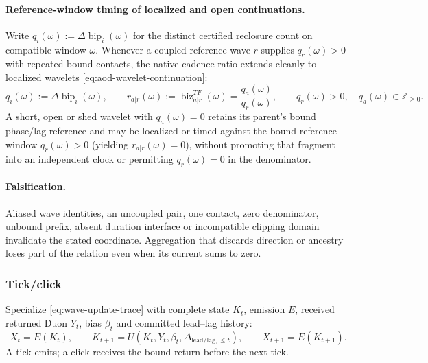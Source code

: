 \paragraph{Reference-window timing of localized and open continuations.}
Write \(q_i(\omega):=\Delta\operatorname{bip}_i(\omega)\) for the distinct
certified reclosure count on compatible window \(\omega\). Whenever a coupled
reference wave \(r\) supplies \(q_r(\omega)>0\) with repeated bound contacts,
the native cadence ratio extends cleanly to localized wavelets \eqref{eq:aod-wavelet-continuation}:
\begin{equation}
q_i(\omega):=\Delta\operatorname{bip}_i(\omega),
\qquad
r_{a|r}(\omega):=\operatorname{biz}^{TF}_{a|r}(\omega)=\frac{q_a(\omega)}{q_r(\omega)},
\qquad
q_r(\omega)>0,\quad q_a(\omega)\in\mathbb Z_{\ge 0}.
\label{eq:wavelet-reference-timing}
\end{equation}
A short, open or shed wavelet with \(q_a(\omega)=0\) retains its parent's bound
phase/lag reference and may be localized or timed against the bound reference
window \(q_r(\omega)>0\) (yielding \(r_{a|r}(\omega)=0\)), without promoting
that fragment into an independent clock or permitting \(q_r(\omega)=0\) in the
denominator.

\paragraph{Falsification.}
Aliased wave identities, an uncoupled pair, one contact, zero denominator,
unbound prefix, absent duration interface or incompatible clipping domain
invalidate the stated coordinate. Aggregation that discards direction or
ancestry loses part of the relation even when its current sums to zero.


\subsubsection{Tick/click}
\label{subsec:duon-tick-click}
Specialize \eqref{eq:wave-update-trace} with complete state \(K_t\),
emission \(E\), received returned Duon \(Y_t\), bias \(\beta_t\) and committed
lead--lag history:
\[
X_t=E(K_t),\qquad
K_{t+1}=U(K_t,Y_t,\beta_t,\Delta_{\mathrm{lead/lag},\le t}),\qquad
X_{t+1}=E(K_{t+1}).
\]
A tick emits; a click receives the bound return before the next tick.

